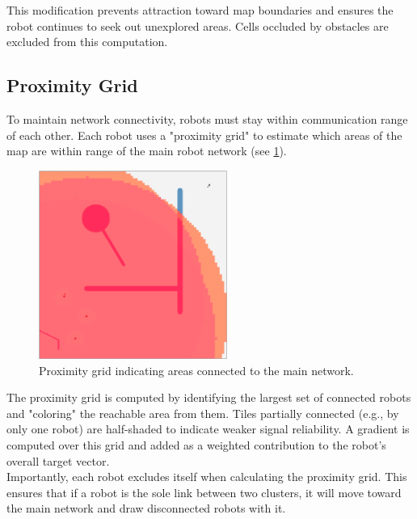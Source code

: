 This modification prevents attraction toward map boundaries and ensures the robot continues to seek out unexplored areas. Cells occluded by obstacles are excluded from this computation.


\subsection{Proximity Grid}
To maintain network connectivity, robots must stay within communication range of each other. Each robot uses a "proximity grid" to estimate which areas of the map are within range of the main robot network (see \cref{fig:proximity-grid}).

\begin{figure}[H]
    \begin{center}
        \includegraphics[width=0.55\textwidth]{figures/screenshots/proximity-gradient.png}
    \end{center}
    \caption{Proximity grid indicating areas connected to the main network.}
    \label{fig:proximity-grid}
\end{figure}

The proximity grid is computed by identifying the largest set of connected robots and "coloring" the reachable area from them. Tiles partially connected (e.g., by only one robot) are half-shaded to indicate weaker signal reliability. A gradient is computed over this grid and added as a weighted contribution to the robot’s overall target vector. \\

Importantly, each robot excludes itself when calculating the proximity grid. This ensures that if a robot is the sole link between two clusters, it will move toward the main network and draw disconnected robots with it. \\

